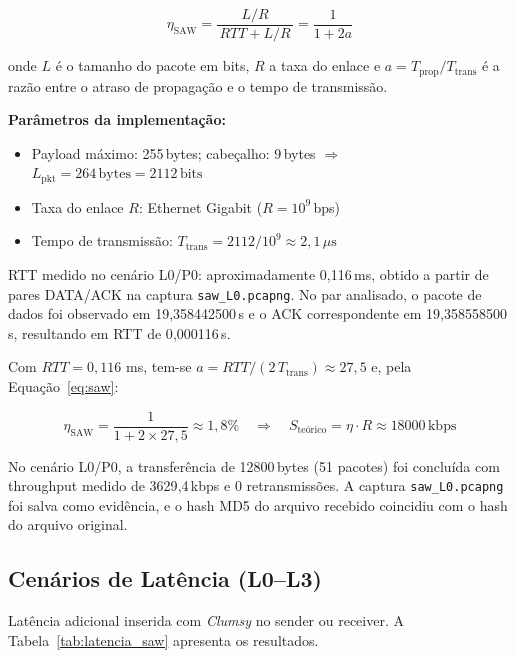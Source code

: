 \documentclass[10pt,a4paper]{article}
\begin{document}
\begin{equation}
  \eta_{\text{SAW}} = \frac{L/R}{\,RTT + L/R\,} = \frac{1}{1 + 2a}
  \label{eq:saw}
\end{equation}

onde $L$ é o tamanho do pacote em bits, $R$ a taxa do enlace e
$a = T_{\text{prop}} / T_{\text{trans}}$ é a razão entre o atraso de
propagação e o tempo de transmissão.

\noindent\textbf{Parâmetros da implementação:}
\begin{itemize}[nosep]
  \item Payload máximo: 255\,bytes; cabeçalho: 9\,bytes $\Rightarrow$
        $L_{\text{pkt}} = 264\,\text{bytes} = 2112\,\text{bits}$
  \item Taxa do enlace $R$: Ethernet Gigabit ($R = 10^{9}$\,bps)
  \item Tempo de transmissão: $T_{\text{trans}} = 2112 / 10^{9} \approx 2{,}1\,\mu\text{s}$
\end{itemize}

\vspace{4pt}
RTT medido no cenário L0/P0: aproximadamente 0{,}116\,ms, obtido a partir de
pares DATA/ACK na captura \texttt{saw\_L0.pcapng}. No par analisado, o pacote de
dados foi observado em 19{,}358442500\,s e o ACK correspondente em
19{,}358558500\,s, resultando em RTT de 0{,}000116\,s.

\vspace{4pt}
\noindent Com $RTT = 0{,}116$ ms, tem-se $a = RTT/(2\,T_{\text{trans}}) \approx 27{,}5$
e, pela Equação~\ref{eq:saw}:

\begin{equation*}
  \eta_{\text{SAW}} = \frac{1}{1 + 2 \times 27{,}5} \approx 1{,}8\%
  \quad\Rightarrow\quad
  S_{\text{teórico}} = \eta \cdot R \approx 18000\,\text{kbps}
\end{equation*}

No cenário L0/P0, a transferência de 12800\,bytes (51 pacotes) foi concluída com
throughput medido de 3629{,}4\,kbps e 0 retransmissões. A captura
\texttt{saw\_L0.pcapng} foi salva como evidência, e o hash MD5 do arquivo recebido
coincidiu com o hash do arquivo original.

\subsection{Cenários de Latência (L0–L3)}

Latência adicional inserida com \textit{Clumsy} no sender ou receiver.
A Tabela~\ref{tab:latencia_saw} apresenta os resultados.
\end{document}

